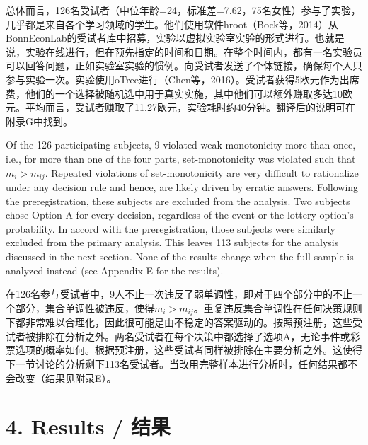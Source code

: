 \documentclass[12pt,a4paper]{article}
\newenvironment{original}
  {\par\medskip\noindent\color{black}\ignorespaces}
  {\par\medskip}
\newenvironment{translation}
  {\par\noindent\color{transblue}\ignorespaces}
  {\par\medskip\medskip}
\begin{document}
\begin{translation}
总体而言，126名受试者（中位年龄=24，标准差=7.62，75名女性）参与了实验，几乎都是来自各个学习领域的学生。他们使用软件hroot（Bock等，2014）从BonnEconLab的受试者库中招募，实验以虚拟实验室实验的形式进行。也就是说，实验在线进行，但在预先指定的时间和日期。在整个时间内，都有一名实验员可以回答问题，正如实验室实验的惯例。向受试者发送了个体链接，确保每个人只参与实验一次。实验使用oTree进行（Chen等，2016）。受试者获得5欧元作为出席费，他们的一个选择被随机选中用于真实实施，其中他们可以额外赚取多达10欧元。平均而言，受试者赚取了11.27欧元，实验耗时约40分钟。翻译后的说明可在附录G中找到。
\end{translation}

\begin{original}
Of the 126 participating subjects, 9 violated weak monotonicity more than once, i.e., for more than one of the four parts, set-monotonicity was violated such that $m_i > m_{ij}$. Repeated violations of set-monotonicity are very difficult to rationalize under any decision rule and hence, are likely driven by erratic answers. Following the preregistration, these subjects are excluded from the analysis. Two subjects chose Option A for every decision, regardless of the event or the lottery option's probability. In accord with the preregistration, those subjects were similarly excluded from the primary analysis. This leaves 113 subjects for the analysis discussed in the next section. None of the results change when the full sample is analyzed instead (see Appendix E for the results).
\end{original}

\begin{translation}
在126名参与受试者中，9人不止一次违反了弱单调性，即对于四个部分中的不止一个部分，集合单调性被违反，使得$m_i > m_{ij}$。重复违反集合单调性在任何决策规则下都非常难以合理化，因此很可能是由不稳定的答案驱动的。按照预注册，这些受试者被排除在分析之外。两名受试者在每个决策中都选择了选项A，无论事件或彩票选项的概率如何。根据预注册，这些受试者同样被排除在主要分析之外。这使得下一节讨论的分析剩下113名受试者。当改用完整样本进行分析时，任何结果都不会改变（结果见附录E）。
\end{translation}

\newpage
\section{4. Results / 结果}
\end{document}

